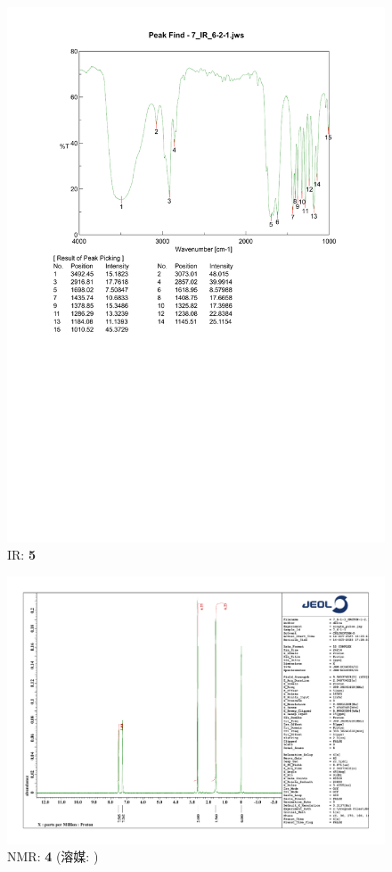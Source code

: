 \documentclass{ltjsarticle}
\theoremstyle{definition}
\numberwithin{equation}{section}
\begin{document}
\begin{figure}[htbp]
\begin{center}
\includegraphics[width = 15 cm]{IR_6-2-1.pdf}
\caption{IR: \textbf{5}}
\label{IR_6-2-1}
\end{center}
\end{figure}


\begin{figure}[htbp]
\begin{center}
\includegraphics[width = 15 cm]{NMR_6-1-3.pdf}
\caption{NMR: \textbf{4} (溶媒: )}
\label{NMR_6-1-3}
\end{center}
\end{figure}
\end{document}
